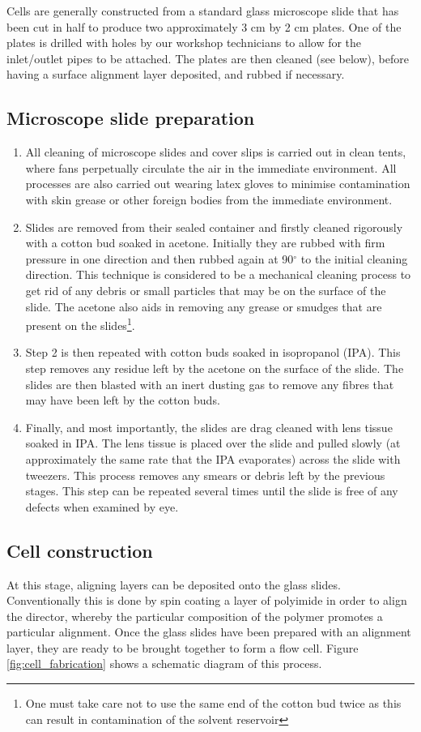 Cells are generally constructed from a standard glass microscope slide that has been cut in half to produce two approximately 3 cm by 2 cm plates. One of the plates is drilled with holes by our workshop technicians to allow for the inlet/outlet pipes to be attached. The plates are then cleaned (see below), before having a surface alignment layer deposited, and rubbed if necessary.

\subsection{Microscope slide preparation}
\begin{enumerate}
\item 
All cleaning of microscope slides and cover slips is carried out in clean tents, where fans perpetually circulate the air in the immediate environment. All processes are also carried out wearing latex gloves to minimise contamination with skin grease or other foreign bodies from the immediate environment.
\item 
Slides are removed from their sealed container and firstly cleaned rigorously with a cotton bud soaked in acetone. Initially they are rubbed with firm pressure in one direction and then rubbed again at 90$^{\circ}$ to the initial cleaning direction. This technique is considered to be a mechanical cleaning process to get rid of any debris or small particles that may be on the surface of the slide. The acetone also aids in removing any grease or smudges that are present on the slides\footnote{One must take care not to use the same end of the cotton bud twice as this can result in contamination of the solvent reservoir}.
\item 
Step 2 is then repeated with cotton buds soaked in isopropanol (IPA). This step removes any residue left by the acetone on the surface of the slide. The slides are then blasted with an inert dusting gas to remove any fibres that may have been left by the cotton buds.
\item 
Finally, and most importantly, the slides are drag cleaned with lens tissue soaked in IPA. The lens tissue is placed over the slide and pulled slowly (at approximately the same rate that the IPA evaporates) across the slide with tweezers. This process removes any smears or debris left by the previous stages. This step can be repeated several times until the slide is free of any defects when examined by eye.
\end{enumerate}

\subsection{Cell construction}
\label{sec:cell_construction}
At this stage, aligning layers can be deposited onto the glass slides. Conventionally this is done by spin coating a layer of polyimide in order to align the director, whereby the particular composition of the polymer promotes a particular alignment. Once the glass slides have been prepared with an alignment layer, they are ready to be brought together to form a flow cell. Figure \ref{fig:cell_fabrication} shows a schematic diagram of this process. 

